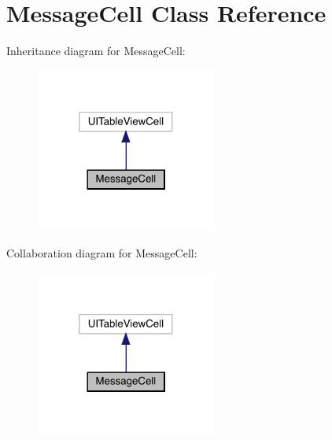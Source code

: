 \hypertarget{interface_message_cell}{}\section{Message\+Cell Class Reference}
\label{interface_message_cell}


Inheritance diagram for Message\+Cell\+:\nopagebreak
\begin{figure}[H]
\begin{center}
\leavevmode
\includegraphics[width=169pt]{interface_message_cell__inherit__graph}
\end{center}
\end{figure}


Collaboration diagram for Message\+Cell\+:\nopagebreak
\begin{figure}[H]
\begin{center}
\leavevmode
\includegraphics[width=169pt]{interface_message_cell__coll__graph}
\end{center}
\end{figure}
